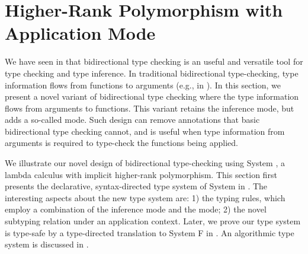 \chapter{Higher-Rank Polymorphism with Application Mode}
\label{chap:BiDirectional}

We have seen in  that bidirectional type checking is an useful and
versatile tool for type checking and type inference. In traditional
bidirectional type-checking, type information flows from functions to arguments
(e.g.,  in ). In this section, we
present a novel variant of bidirectional type checking where the type
information flows from arguments to functions. This variant retains the
inference mode, but adds a so-called \textit{\mode} mode. Such design can remove
annotations that basic bidirectional type checking cannot, and is useful when
type information from arguments is required to type-check the functions being
applied.

We illustrate our novel design of bidirectional type-checking using System \ap,
a lambda calculus with implicit higher-rank polymorphism. This section first
presents the declarative, syntax-directed type system of System \ap
in . The interesting aspects about the new type system
are: 1) the typing rules, which employ a combination of the inference mode and
the \textit{\mode} mode; 2) the novel subtyping relation under an application
context. Later, we prove our type system is type-safe by a type-directed
translation to System F in . An algorithmic type system
is discussed in .











